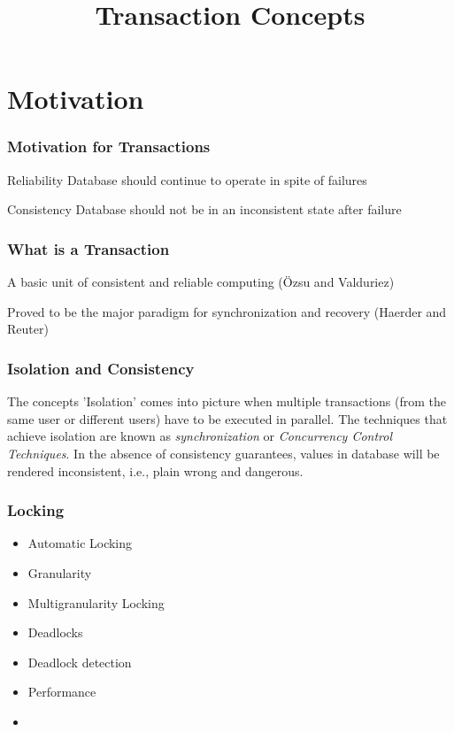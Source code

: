 \documentclass[12]{beamer}
\title{Transaction Concepts}
\date
\begin{document}
\maketitle

\section{Motivation}

\begin{frame}
\frametitle{Motivation for Transactions}
\begin{block}{Reliability}
Database should continue to operate in spite of failures
\end{block}
\begin{block}{Consistency}
Database should not be in an inconsistent state after failure \end{block}
\end{frame}

%
%
\begin{frame}
  \frametitle{What is a Transaction}
  \begin{definition}
    A basic unit of consistent and reliable computing (\"Ozsu and Valduriez) 
  \end{definition}
\vspace{5mm}
Proved to be the major paradigm for synchronization and recovery (Haerder and Reuter)
\end{frame}



\begin{frame}
\frametitle{Isolation and Consistency}
The concepts 'Isolation' comes into picture when multiple transactions (from the same user or different users) have to be executed in parallel.
\vspace{5mm}
The techniques that achieve isolation are known as \textit{synchronization} or \textit{Concurrency Control Techniques}. In the absence of consistency guarantees, values in database will be rendered inconsistent, i.e., plain wrong and dangerous.
\end{frame}

\begin{frame}
  \frametitle{Locking}
  \begin{itemize}
	\item Automatic Locking
	\item Granularity
	\item Multigranularity Locking
	\item Deadlocks
	\item Deadlock detection
	\item Performance
	\item 
  \end{itemize}
\end{frame}
\end{document}
